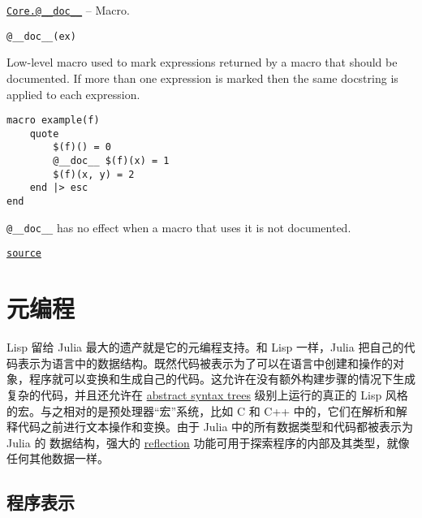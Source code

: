 \hypertarget{8194145670752069829}{}
\hyperlink{8194145670752069829}{\texttt{Core.@\_\_doc\_\_}}  -- {Macro.}

\begin{adjustwidth}{2em}{0pt}


\begin{verbatim}
@__doc__(ex)
\end{verbatim}

Low-level macro used to mark expressions returned by a macro that should be documented. If more than one expression is marked then the same docstring is applied to each expression.


\begin{lstlisting}
macro example(f)
    quote
        $(f)() = 0
        @__doc__ $(f)(x) = 1
        $(f)(x, y) = 2
    end |> esc
end
\end{lstlisting}

\texttt{@\_\_doc\_\_} has no effect when a macro that uses it is not documented.



\href{https://github.com/JuliaLang/julia/blob/9058264a69f9efc1af805c4473c946f87859b731/base/docs/Docs.jl#L440-L455}{\texttt{source}}


\end{adjustwidth}

\hypertarget{16614739534143995624}{}


\chapter{元编程}



Lisp 留给 Julia 最大的遗产就是它的元编程支持。和 Lisp 一样，Julia 把自己的代码表示为语言中的数据结构。既然代码被表示为了可以在语言中创建和操作的对象，程序就可以变换和生成自己的代码。这允许在没有额外构建步骤的情况下生成复杂的代码，并且还允许在 \href{https://en.wikipedia.org/wiki/Abstract\_syntax\_tree}{abstract syntax trees} 级别上运行的真正的 Lisp 风格的宏。与之相对的是预处理器“宏”系统，比如 C 和 C++ 中的，它们在解析和解释代码之前进行文本操作和变换。由于 Julia 中的所有数据类型和代码都被表示为 Julia 的 数据结构，强大的 \href{https://en.wikipedia.org/wiki/Reflection\_omputer\_\%28cprogramming\%29}{reflection} 功能可用于探索程序的内部及其类型，就像任何其他数据一样。



\hypertarget{13890173916214395200}{}


\section{程序表示}



